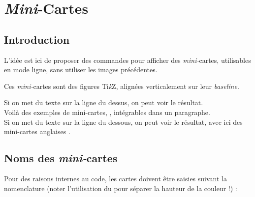 \documentclass[a4paper]{article}
\providecommand\tikzlogo{Ti\textit{k}Z}
\let\TikZ\tikzlogo
\newcommand\ctex[1]{\tcbox[vignettelatex]{#1}\xspace}
\begin{document}
{{{{{{{{{{{\section{\textit{Mini}-Cartes}

\subsection{Introduction}

\begin{codeidee}
L'idée est ici de proposer des commandes pour afficher des \textit{mini-}cartes, utilisables en mode ligne, sans utiliser les images précédentes.

\smallskip

Ces \textit{mini-}cartes sont des figures \TikZ, alignées verticalement sur leur \textit{baseline}.
\end{codeidee}

\begin{codetex}
\end{codetex}

\begin{codetex}[]
Si on met du texte sur la ligne du dessus, on peut voir le résultat.\\
Voilà des exemples de mini-cartes, , intégrables dans un paragraphe.\\
Si on met du texte sur la ligne du dessous, on peut voir le résultat, avec ici des mini-cartes anglaises .
\end{codetex}

\subsection{Noms des \textit{mini-}cartes}

\begin{codeinfo}
Pour des raisons internes au code, les cartes doivent être saisies suivant la nomenclature (noter l'utilisation du \ctex{.} pour séparer la hauteur de la couleur !)  :


\end{codeinfo}}}}}}}}}}}}
\end{document}
